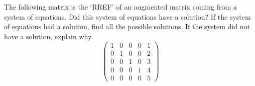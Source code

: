 \documentclass[11pt,letterpaper]{article}
\begin{document}
\newpage



 The following matrix is the `RREF' of an augmented matrix coming from a system of equations. Did this system of equations have a solution? If the system of equations had a solution, find all the possible solutions. If the system did not have a solution, explain why. 
	\[
	\begin{pmatrix}
	1 & 0 & 0 & 0 & 1 \\
	0 & 1 & 0 & 0 & 2 \\
	0 & 0 & 1 & 0 & 3 \\
	0 & 0 & 0 & 1 & 4 \\
	0 & 0 & 0 & 0 & 5 
	\end{pmatrix}
	\]
\end{document}
